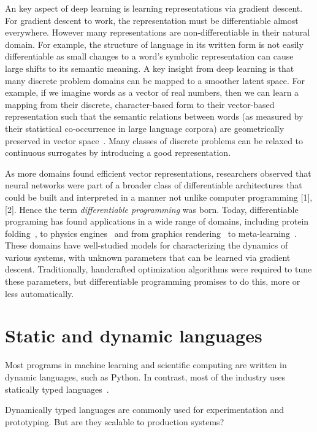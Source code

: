 \documentclass[12pt,initial,twoside,maitrise]{dms}
\numberwithin{equation}{section}
\numberwithin{table}{chapter}
\numberwithin{figure}{chapter}
\begin{document}
An key aspect of deep learning is learning representations via gradient descent. For gradient descent to work, the representation must be differentiable almost everywhere. However many representations are non-differentiable in their natural domain. For example, the structure of language in its written form is not easily differentiable as small changes to a word's symbolic representation can cause large shifts to its semantic meaning. A key insight from deep learning is that many discrete problem domains can be mapped to a smoother latent space. For example, if we imagine words as a vector of real numbers, then we can learn a mapping from their discrete, character-based form to their vector-based representation such that the semantic relations between words (as measured by their statistical co-occurrence in large language corpora) are geometrically preserved in vector space~\cite{pennington2014glove}. Many classes of discrete problems can be relaxed to continuous surrogates by introducing a good representation.

As more domains found efficient vector representations, researchers observed that neural networks were part of a broader class of differentiable architectures that could be built and interpreted in a manner not unlike computer programming [1], [2]. Hence the term \textit{differentiable programming} was born. Today, differentiable programing has found applications in a wide range of domains, including protein folding~\cite{alquraishi2018end}, to physics engines~\cite{de2018end,DBLP:journals_corr_DegraveHDW16} and from graphics rendering~\cite{loper2014opendr} to meta-learning~\cite{liu2018darts}. These domains have well-studied models for characterizing the dynamics of various systems, with unknown parameters that can be learned via gradient descent. Traditionally, handcrafted optimization algorithms were required to tune these parameters, but differentiable programming promises to do this, more or less automatically.

\section{Static and dynamic languages}

Most programs in machine learning and scientific computing are written in dynamic languages, such as Python. In contrast, most of the industry uses statically typed languages~\cite{github}.

Dynamically typed languages are commonly used for experimentation and prototyping. But are they scalable to production systems?
\end{document}
